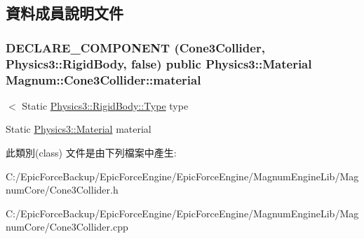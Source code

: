 \subsection{資料成員說明文件}
\subsubsection[{\texorpdfstring{material}{material}}]{\setlength{\rightskip}{0pt plus 5cm}D\+E\+C\+L\+A\+R\+E\+\_\+\+C\+O\+M\+P\+O\+N\+E\+NT ({\bf Cone3\+Collider}, {\bf Physics3\+::\+Rigid\+Body}, false) public {\bf Physics3\+::\+Material} Magnum\+::\+Cone3\+Collider\+::material}\hypertarget{class_magnum_1_1_cone3_collider_aa4019240771cd0f0d0165abbe522a947}{}\label{class_magnum_1_1_cone3_collider_aa4019240771cd0f0d0165abbe522a947}


$<$ Static \hyperlink{class_magnum_1_1_physics3_1_1_rigid_body_a429aa4fb7256b083334c86cdcd0d6b31}{Physics3\+::\+Rigid\+Body\+::\+Type} type 

Static \hyperlink{class_magnum_1_1_physics3_1_1_material}{Physics3\+::\+Material} material 

此類別(class) 文件是由下列檔案中產生\+:\begin{DoxyCompactItemize}
\item 
C\+:/\+Epic\+Force\+Backup/\+Epic\+Force\+Engine/\+Epic\+Force\+Engine/\+Magnum\+Engine\+Lib/\+Magnum\+Core/Cone3\+Collider.\+h\item 
C\+:/\+Epic\+Force\+Backup/\+Epic\+Force\+Engine/\+Epic\+Force\+Engine/\+Magnum\+Engine\+Lib/\+Magnum\+Core/Cone3\+Collider.\+cpp\end{DoxyCompactItemize}
